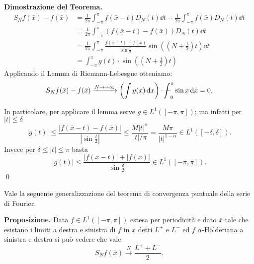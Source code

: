 \textbf{Dimostrazione del Teorema.}
\begin{align*}
	S_N f(\bar x) - f(\bar x) 
	&= \frac{1}{2\pi} \int_{-\pi}^\pi f(\bar x - t) D_N(t) \dd t - \frac{1}{2\pi} \int_{-\pi}^\pi f(\bar x) D_N(t) \dd t \\
	&= \frac{1}{2\pi} \int_{-\pi}^\pi (f(\bar x - t) - f(\bar x)) D_N(t) \dd t \\
	&= \frac{1}{2\pi} \int_{-\pi}^\pi \frac{f(\bar x - t) - f(\bar x)}{\sin \frac{t}{2}} \sin \left(\left(N + \frac{1}{2}\right) t\right) \dd t \\
	&= \int_{-\pi}^\pi g(t) \cdot \sin \left(\left(N + \frac{1}{2}\right) t\right)
\end{align*}
Applicando il Lemma di Riemann-Lebesgue otteniamo:
%
$$
	S_N f(\bar{x}) - f(\bar{x}) \xrightarrow{N \to +\infty} \left(\int g(x) \dd x\right) \cdot \avint_0^\pi \sin x \dd x = 0.
$$
%

In particolare, per applicare il lemma serve $g \in L^1([-\pi, \pi])$; ma infatti per $|t| \leq \delta$
$$
	|g(t)| \leq \frac{|f(\bar x - t) - f(\bar x)|}{|\sin \frac{t}{2}|} \leq \frac{M |t|^\alpha}{|t| / \pi} = \frac{M \pi}{|t|^{1 - \alpha}} \in L^1([-\delta, \delta]).
$$
Invece per $\delta \leq |t| \leq \pi$ basta
$$
	|g(t)| \leq \frac{|f(\bar x - t)| + |f(\bar x)|}{\sin \frac{\delta}{2}} \in L^1([-\pi, \pi]).
$$
\qed

Vale la seguente generalizzazione del teorema di convergenza puntuale della serie di Fourier.

\textbf{Proposizione.} Data $f \in L^1([-\pi, \pi])$ estesa per periodicità e dato $\bar x$ tale che esistano i limiti a destra e sinistra di $f$ in $\bar x$ detti $L^+$ e $L^-$ ed $f$ $\alpha$-H\"olderiana a sinistra e destra si può vedere che vale
$$
	S_N f(\bar x) \xrightarrow{N} \frac{L^+ + L^-}{2}.
$$
